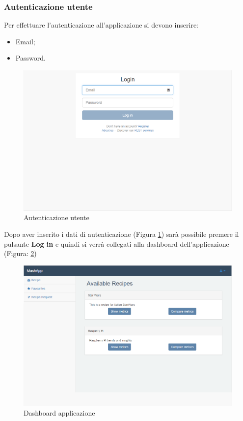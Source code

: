 		\pagebreak
		\subsubsection{Autenticazione utente} %
		\label{sec:autenticazione_utente}
			Per effettuare l'autenticazione all'applicazione si devono inserire:
			\begin{itemize}
				\item Email;
				\item Password.
			\end{itemize}
			\begin{figure}[H]
				\centering
				\centerline{\includegraphics[width=14cm]{images/autenticazione_utente.png}}
				\caption{Autenticazione utente}
				\label{fig:registrazione_utente_accesso}
			\end{figure}
			Dopo aver inserito i dati di autenticazione (Figura \ref{fig:registrazione_utente_accesso}) sarà possibile premere il pulsante \textbf{Log in} e quindi si verrà collegati alla dashboard dell'applicazione (Figura: \ref{fig:dashboard})
			\begin{figure}[H]
				\centering
				\centerline{\includegraphics[width=19cm]{images/dashboard.png}}
				\caption{Dashboard applicazione}
				\label{fig:dashboard}
			\end{figure}



